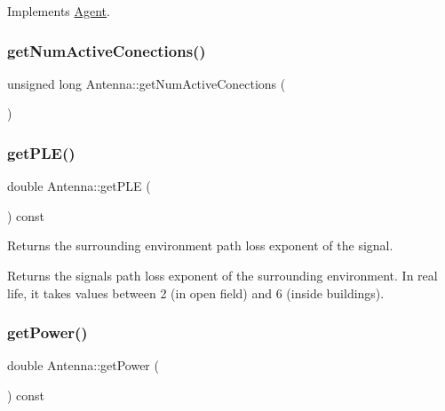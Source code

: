 Implements \hyperlink{class_agent_afe6c72d91baf9ee4fe77ea1ed7fef3ba}{Agent}.

\mbox{\label{class_antenna_a86c5c094ab6ea432609afa00f3a8080a}} 
\subsubsection{\texorpdfstring{get\+Num\+Active\+Conections()}{getNumActiveConections()}}
{\footnotesize\ttfamily unsigned long Antenna\+::get\+Num\+Active\+Conections (\begin{DoxyParamCaption}{ }\end{DoxyParamCaption})\hspace{0.3cm}{\ttfamily [private]}}

\mbox{\label{class_antenna_ab0c45eb94291446fc48c312854f8818d}} 
\subsubsection{\texorpdfstring{get\+P\+L\+E()}{getPLE()}}
{\footnotesize\ttfamily double Antenna\+::get\+P\+LE (\begin{DoxyParamCaption}{ }\end{DoxyParamCaption}) const}

Returns the surrounding environment\textquotesingle{} path loss exponent of the signal. \begin{DoxyReturn}{Returns}
the signals\textquotesingle{} path loss exponent of the surrounding environment. In real life, it takes values between 2 (in open field) and 6 (inside buildings). 
\end{DoxyReturn}
\mbox{\label{class_antenna_afca01d00c8e393ee911f1e9240b51d2e}} 
\subsubsection{\texorpdfstring{get\+Power()}{getPower()}}
{\footnotesize\ttfamily double Antenna\+::get\+Power (\begin{DoxyParamCaption}{ }\end{DoxyParamCaption}) const}

